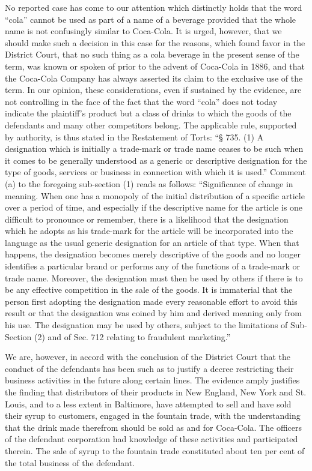 No reported case has come to our attention which distinctly holds that the word
``cola'' cannot be used as part of a name of a beverage provided that the whole
name is not confusingly similar to Coca-Cola. It is urged, however, that we
should make such a decision in this case for the reasons, which found favor in
the District Court, that no such thing as a cola beverage in the present sense
of the term, was known or spoken of prior to the advent of Coca-Cola in 1886,
and that the Coca-Cola Company has always asserted its claim to the exclusive
use of the term. In our opinion, these considerations, even if sustained by the
evidence, are not controlling in the face of the fact that the word ``cola''
does not today indicate the plaintiff's product but a class of drinks to which
the goods of the defendants and many other competitors belong. The applicable
rule, supported by authority, is thus stated in the Restatement of Torts:
``{\S} 735. (1) A designation which is initially a trade-mark or trade name
ceases to be such when it comes to be generally understood as a generic or
descriptive designation for the type of goods, services or business in
connection with which it is used.'' Comment (a) to the foregoing sub-section
(1) reads as follows: ``Significance of change in meaning. When one has a
monopoly of the initial distribution of a specific article over a period of
time, and especially if the descriptive name for the article is one difficult
to pronounce or remember, there is a likelihood that the designation which he
adopts as his trade-mark for the article will be incorporated into the language
as the usual generic designation for an article of that type. When that
happens, the designation becomes merely descriptive of the goods and no longer
identifies a particular brand or performs any of the functions of a trade-mark
or trade name. Moreover, the designation must then be used by others if there
is to be any effective competition in the sale of the goods. It is immaterial
that the person first adopting the designation made every reasonable effort to
avoid this result or that the designation was coined by him and derived meaning
only from his use. The designation may be used by others, subject to the
limitations of Sub-Section (2) and of Sec. 712 relating to fraudulent
marketing.''

We are, however, in accord with the conclusion of the District Court that the
conduct of the defendants has been such as to justify a decree restricting
their business activities in the future along certain lines. The evidence amply
justifies the finding that distributors of their products in New England, New
York and St. Louis, and to a less extent in Baltimore, have attempted to sell
and have sold their syrup to customers, engaged in the fountain trade, with the
understanding that the drink made therefrom should be sold as and for
Coca-Cola. The officers of the defendant corporation had knowledge of these
activities and participated therein. The sale of syrup to the fountain trade
constituted about ten per cent of the total business of the defendant.

